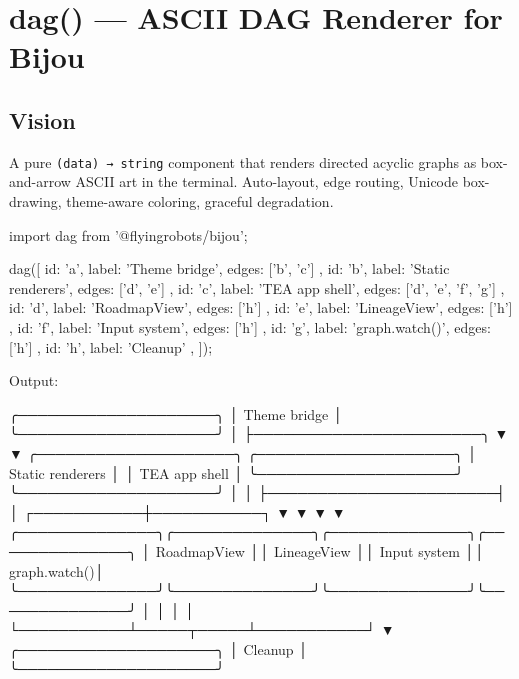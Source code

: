 \chapter{dag() --- ASCII DAG Renderer for Bijou}\label{record-426}

\smallskip

\section{Vision}\label{record-426-vision}

A pure \texttt{(\allowbreak{}d\allowbreak{}a\allowbreak{}t\allowbreak{}a\allowbreak{})\allowbreak{} \allowbreak{}→\allowbreak{} \allowbreak{}s\allowbreak{}t\allowbreak{}r\allowbreak{}i\allowbreak{}n\allowbreak{}g} component that renders directed acyclic graphs as box-and-arrow ASCII art in the terminal. Auto-layout, edge routing, Unicode box-drawing, theme-aware coloring, graceful degradation.

\begin{CodeBlock}
import { dag } from '@flyingrobots/bijou';

dag([
  { id: 'a', label: 'Theme bridge', edges: ['b', 'c'] },
  { id: 'b', label: 'Static renderers', edges: ['d', 'e'] },
  { id: 'c', label: 'TEA app shell', edges: ['d', 'e', 'f', 'g'] },
  { id: 'd', label: 'RoadmapView', edges: ['h'] },
  { id: 'e', label: 'LineageView', edges: ['h'] },
  { id: 'f', label: 'Input system', edges: ['h'] },
  { id: 'g', label: 'graph.watch()', edges: ['h'] },
  { id: 'h', label: 'Cleanup' },
]);
\end{CodeBlock}

Output:

\begin{CodeBlock}
╭────────────────────╮
│ Theme bridge       │
╰────────────────────╯
          │
          ├───────────────────────╮
          ▼                       ▼
╭────────────────────╮  ╭────────────────────╮
│ Static renderers   │  │ TEA app shell      │
╰────────────────────╯  ╰────────────────────╯
          │                       │
          ├───────────────────────┤
          │           ┌───────────┼───────────┐
          ▼           ▼           ▼           ▼
╭──────────────╮╭──────────────╮╭──────────────╮╭──────────────╮
│ RoadmapView  ││ LineageView  ││ Input system ││ graph.watch()│
╰──────────────╯╰──────────────╯╰──────────────╯╰──────────────╯
          │           │           │           │
          └───────────┴─────┬─────┴───────────┘
                            ▼
                  ╭────────────────────╮
                  │ Cleanup            │
                  ╰────────────────────╯
\end{CodeBlock}

